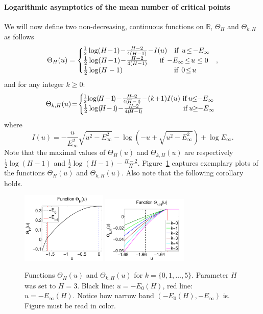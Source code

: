 \documentclass[twoside]{article}
\begin{document}
\paragraph{Logarithmic asymptotics of the mean number of critical points}
We will now define two non-decreasing, continuous functions on $\mathbb{R}$, $\Theta_H$ and $\Theta_{k,H}$ as follows
\[\Theta_H(u) = \left \{
  \begin{tabular}{c}
  $\!\!\!\!\frac{1}{2}\log(H\!-\!1) \!-\! \frac{H-2}{4(H-1)} \!-\! I(u)$ $\:\:\:$if$\:\:$$u \!\leq\! -E_{\infty}$\\
  $\!\!\!\!\!\frac{1}{2}\log(H\!-\!1) \!-\! \frac{H-2}{4(H-1)}$ $\:\:\:\:\:\:$if$\:\:$$-E_{\infty} \!\leq\! u \leq 0$\\
  $\!\!\!\!\!\!\!\!\!\!\!\!\!\!\!\frac{1}{2}\log(H-1)$ $\:\:\:\:\:\:\:\:\:\:\:\:\:\:\:\:\:\:\:\:\:\:\:\:\:\:\:\:\:\:\:$if$\:\:$$0 \!\leq\! u$
  \end{tabular}
\right.,
\]
and for any integer $k \geq 0$:
\[\Theta_{k,H}(u) \!=\! \left \{
  \begin{tabular}{c}
  $\!\!\!\!\!\frac{1}{2}\!\log(\!H\!-\!1\!) \!-\! \frac{H\!-\!2}{4(\!H-1\!)} \!-\! (k\!+\!1)I(u)$ if$\:$$u \!\!\leq\!\! -E_{\infty}$\\
  $\!\!\!\!\frac{1}{2}\log(\!H\!-\!1\!) \!-\! \frac{H\!-\!2}{4(\!H-1\!)}$ $\:\:\:\:\:\:\:\:\:\:\:\:\:\:\:\:\:\:\:\:\:\:\:\:$if$\:$$u \!\!\geq\!\! -E_{\infty}$
  \end{tabular}
\right.
\]
where 
\[I(u) = -\frac{u}{E_{\infty}^2}\sqrt{u^2 - E_{\infty}^2} - \log(-u + \sqrt{u^2 - E_{\infty}^2}) + \log E_{\infty}.
\]
Note that the maximal values of $\Theta_H(u)$ and $\Theta_{k,H}(u)$ are respectively $\frac{1}{2}\log(H-1)$ and $\frac{1}{2}\log(H-1) - \frac{H-2}{H}$. Figure~\ref{fig:Thetas} captures exemplary plots of the functions $\Theta_H(u)$ and $\Theta_{k,H}(u)$. Also note that the following corollary holds.

\begin{figure}[h]
  \center
\includegraphics[width = 1.6in]{Theta_cp.pdf}
\includegraphics[width = 1.6in]{Theta_lm_sp.pdf}
\vspace{-0.3in}
\caption{Functions $\Theta_H(u)$ and $\Theta_{k,H}(u)$ for $k = \{0,1,\dots,5\}$. Parameter $H$ was set to $H = 3$. Black line: $u = -E_0(H)$, red line: $u = -E_{\infty}(H)$. Notice how narrow band $(-E_0(H),-E_{\infty})$ is. Figure must be read in color.}
\label{fig:Thetas}
\end{figure}
\end{document}
